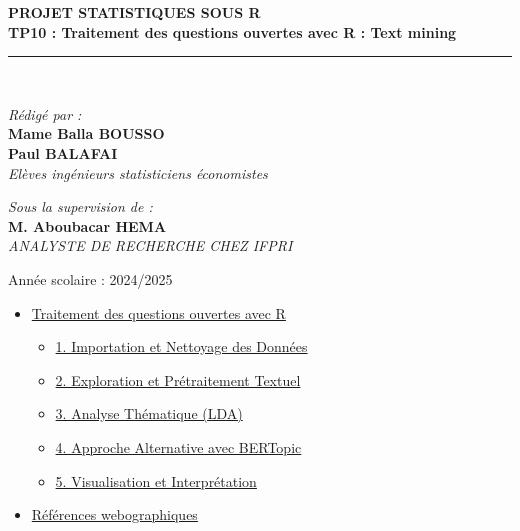 \documentclass[
]{article}
\providecommand{\tightlist}{%
  \setlength{\itemsep}{0pt}\setlength{\parskip}{0pt}}
\begin{document}
\begin{titlepage}
\begin{center}
        \textbf{\LARGE PROJET STATISTIQUES SOUS R }\\[0.3cm]
        \textbf{\Huge \color{blue} \textsf{TP10 : Traitement des questions ouvertes avec R : Text mining}}\\[0.2cm]
        \rule{\linewidth}{0.2mm} \\[0.5cm]
        
        \begin{minipage}{0.5\textwidth}
    \begin{flushleft} \large
        \emph{\textsf{Rédigé par :}}\\
        \textbf{Mame Balla BOUSSO}\\
        \textbf{Paul BALAFAI}\\
        \textit{Elèves ingénieurs statisticiens économistes}
    \end{flushleft}
\end{minipage}
        \hfill
        \begin{minipage}{0.4\textwidth}
            \begin{flushright} \large
                \emph{\textsf{Sous la supervision de :}} \\
                \textbf{M. Aboubacar HEMA}\\
                \textit{ANALYSTE DE RECHERCHE CHEZ IFPRI }
            \end{flushright}
        \end{minipage}

        \vfill

        {\large \textsf{Année scolaire : 2024/2025}}\\[0.5cm]
        
    \end{center}
\end{titlepage}

\begin{itemize}
\tightlist
\item
  \hyperref[analyse-textuelle-des-ruxe9ponses-denquuxeate]{Traitement
  des questions ouvertes avec R}

  \begin{itemize}
  \tightlist
  \item
    \hyperref[2-importation-et-nettoyage-des-donnuxe9es]{1. Importation
    et Nettoyage des Données}
  \item
    \hyperref[3-exploration-et-pruxe9traitement-textuel]{2. Exploration
    et Prétraitement Textuel}
  \item
    \hyperref[4-analyse-thuxe9matique-lda]{3. Analyse Thématique (LDA)}
  \item
    \hyperref[5-approche-alternative-avec-bertopic]{4. Approche
    Alternative avec BERTopic}
  \item
    \hyperref[6-visualisation-et-interpruxe9tation]{5. Visualisation et
    Interprétation}
  \end{itemize}
\item
  \hyperref[ruxe9fuxe9rences-webographiques]{Références webographiques}
\end{itemize}
\end{document}
